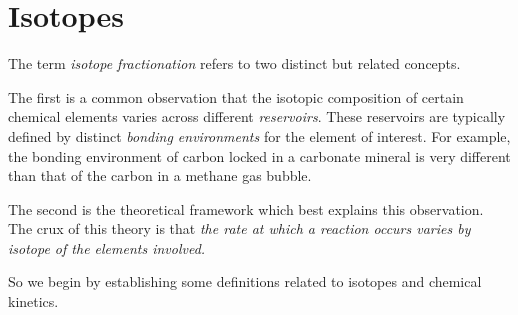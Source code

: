 \chapter{Isotopes}
The term \emph{isotope fractionation} refers to two distinct but related concepts. 

The first is a common observation that the isotopic composition of certain chemical elements varies across different \emph{reservoirs}. These reservoirs are typically defined by distinct \emph{bonding environments} for the element of interest. For example, the bonding environment of carbon locked in a carbonate mineral is very different than that of the carbon in a methane gas bubble.

The second is the theoretical framework which best explains this observation. The crux of this theory is that \emph{the rate at which a reaction occurs varies by isotope of the elements involved.}

So we begin by establishing some definitions related to isotopes and chemical kinetics.

